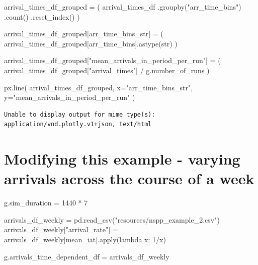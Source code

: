 \documentclass[
  letterpaper,
  DIV=11,
  numbers=noendperiod]{scrreprt}
\newenvironment{Shaded}{}{}
\newcommand{\BuiltInTok}[1]{\textcolor[rgb]{0.84,0.23,0.29}{#1}}
\newcommand{\DecValTok}[1]{\textcolor[rgb]{0.00,0.36,0.77}{#1}}
\newcommand{\KeywordTok}[1]{\textcolor[rgb]{0.84,0.23,0.29}{#1}}
\newcommand{\NormalTok}[1]{\textcolor[rgb]{0.14,0.16,0.18}{#1}}
\newcommand{\OperatorTok}[1]{\textcolor[rgb]{0.14,0.16,0.18}{#1}}
\newcommand{\StringTok}[1]{\textcolor[rgb]{0.01,0.18,0.38}{#1}}
\begin{document}
\begin{Shaded}
\begin{Highlighting}[]
\NormalTok{arrival\_times\_df\_grouped }\OperatorTok{=}\NormalTok{ (}
\NormalTok{  arrival\_times\_df}
\NormalTok{  .groupby(}\StringTok{"arr\_time\_bins"}\NormalTok{)}
\NormalTok{  .count()}
\NormalTok{  .reset\_index()}
\NormalTok{)}
\end{Highlighting}
\end{Shaded}

\begin{Shaded}
\begin{Highlighting}[]
\NormalTok{arrival\_times\_df\_grouped[}\StringTok{\textquotesingle{}arr\_time\_bins\_str\textquotesingle{}}\NormalTok{] }\OperatorTok{=}\NormalTok{ (}
\NormalTok{  arrival\_times\_df\_grouped[}\StringTok{\textquotesingle{}arr\_time\_bins\textquotesingle{}}\NormalTok{].astype(}\StringTok{\textquotesingle{}str\textquotesingle{}}\NormalTok{)}
\NormalTok{)}

\NormalTok{arrival\_times\_df\_grouped[}\StringTok{"mean\_arrivals\_in\_period\_per\_run"}\NormalTok{] }\OperatorTok{=}\NormalTok{ (}
\NormalTok{  arrival\_times\_df\_grouped[}\StringTok{"arrival\_times"}\NormalTok{] }\OperatorTok{/}\NormalTok{ g.number\_of\_runs}
\NormalTok{)}

\NormalTok{px.line(}
\NormalTok{  arrival\_times\_df\_grouped,}
\NormalTok{  x}\OperatorTok{=}\StringTok{"arr\_time\_bins\_str"}\NormalTok{,}
\NormalTok{  y}\OperatorTok{=}\StringTok{"mean\_arrivals\_in\_period\_per\_run"}
\NormalTok{)}
\end{Highlighting}
\end{Shaded}

\begin{verbatim}
Unable to display output for mime type(s): application/vnd.plotly.v1+json, text/html
\end{verbatim}

\section{Modifying this example - varying arrivals across the course of
a
week}\label{modifying-this-example---varying-arrivals-across-the-course-of-a-week}

\begin{Shaded}
\begin{Highlighting}[]
\NormalTok{g.sim\_duration }\OperatorTok{=} \DecValTok{1440} \OperatorTok{*} \DecValTok{7}

\NormalTok{arrivals\_df\_weekly }\OperatorTok{=}\NormalTok{ pd.read\_csv(}\StringTok{"resources/nspp\_example\_2.csv"}\NormalTok{)}
\NormalTok{arrivals\_df\_weekly[}\StringTok{"arrival\_rate"}\NormalTok{] }\OperatorTok{=}\NormalTok{ arrivals\_df\_weekly[}\StringTok{\textquotesingle{}mean\_iat\textquotesingle{}}\NormalTok{].}\BuiltInTok{apply}\NormalTok{(}\KeywordTok{lambda}\NormalTok{ x: }\DecValTok{1}\OperatorTok{/}\NormalTok{x)}

\NormalTok{g.arrivals\_time\_dependent\_df }\OperatorTok{=}\NormalTok{ arrivals\_df\_weekly}
\end{Highlighting}
\end{Shaded}
\end{document}
